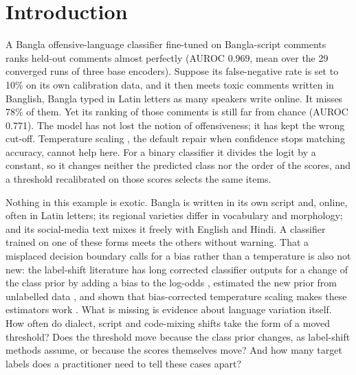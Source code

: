 \section{Introduction}
\label{sec:introduction}

A Bangla offensive-language classifier fine-tuned on Bangla-script comments ranks held-out comments almost perfectly
(AUROC 0.969, mean over the 29 converged runs of three base encoders). Suppose its false-negative rate is set to 10\% on
its own calibration data, and it then meets toxic comments written in Banglish, Bangla typed in Latin letters as many
speakers write online. It misses 78\% of them. Yet its ranking of those comments is still far from chance (AUROC
0.771). The model has not lost the notion of offensiveness; it has kept the wrong cut-off. Temperature scaling
\citep{guo2017calibration}, the default repair when confidence stops matching accuracy, cannot help here. For a binary
classifier it divides the logit by a constant, so it changes neither the predicted class nor the order of the scores,
and a threshold recalibrated on those scores selects the same items.

Nothing in this example is exotic. Bangla is written in its own script and, online, often in Latin letters; its
regional varieties differ in vocabulary and morphology; and its social-media text mixes it freely with English and
Hindi. A classifier trained on one of these forms meets the others without warning. That a misplaced decision boundary
calls for a bias rather than a temperature is also not new: the label-shift literature has long corrected classifier
outputs for a change of the class prior by adding a bias to the log-odds \citep{saerens2002adjusting}, estimated the
new prior from unlabelled data \citep{lipton2018bbse, garg2020unified}, and shown that bias-corrected temperature
scaling makes these estimators work \citep{alexandari2020maximum}. What is missing is evidence about language
variation itself. How often do dialect, script and code-mixing shifts take the form of a moved threshold? Does the
threshold move because the class prior changes, as label-shift methods assume, or because the scores themselves move?
And how many target labels does a practitioner need to tell these cases apart?


